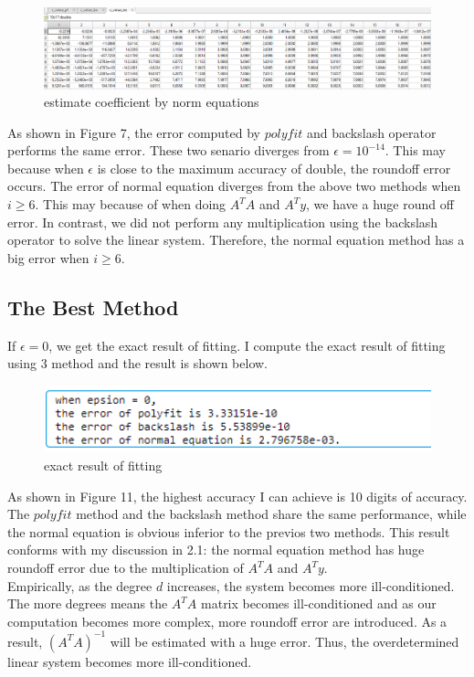 \documentclass[a4paper]{article}
\begin{document}
\begin{figure}[H] 
\centering 
\includegraphics[width=1.0\textwidth]{2.1-4.png}
\caption{estimate coefficient by norm equations} 
\label{Fig.2.1-4} 
\end{figure}

As shown in Figure 7, the error computed by $polyfit$ and backslash operator performs the same error. These two senario diverges from $\epsilon = 10^{-14}$. This may because when $\epsilon$ is close to the maximum accuracy of double, the roundoff error occurs.
The error of normal equation diverges from the above two methods when $i \geq 6$. This may because of when doing $A^{T}A$ and $A^{T}y$,  we have a huge round off error. In contrast, we did not perform any multiplication using the backslash operator to solve the linear system. Therefore, the normal equation method has a big error when $i \geq 6$.


\subsection{The Best Method}
If $\epsilon = 0$, we get the exact result of fitting. I compute the exact result of fitting using 3 method and the result is shown below.

\begin{figure}[H] 
\centering 
\includegraphics[width=1.0\textwidth]{2.1-5.png}
\caption{exact result of fitting} 
\label{Fig.2.1-5} 
\end{figure}

As shown in Figure 11, the highest accuracy I can achieve is 10 digits of accuracy. The $polyfit$ method and the backslash method share the same performance, while the normal equation is obvious inferior to the previos two methods. This result conforms with my discussion in 2.1: the normal equation method has huge roundoff error due to the multiplication of $A^{T}A$ and $A^{T}y$.\\
\indent Empirically, as the degree $d$ increases, the system becomes more ill-conditioned. The more degrees means the $A^{T}A$ matrix becomes ill-conditioned and as our computation becomes more complex, more roundoff error are introduced. As a result, $(A^{T}A)^{-1}$ will be estimated with a huge error. Thus, the overdetermined linear system becomes more ill-conditioned.
\end{document}
